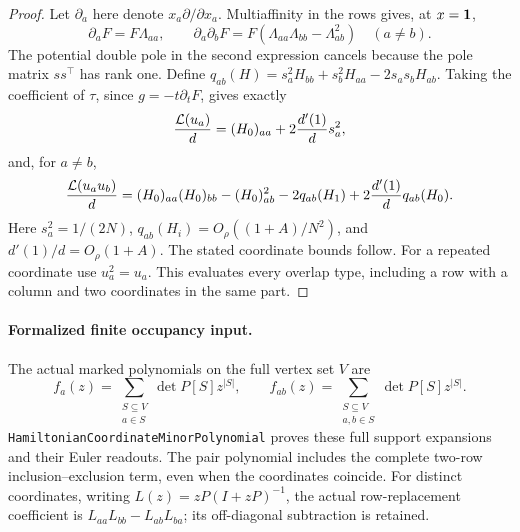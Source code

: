 \begin{proof}
Let \(\partial_a\) here denote \(x_a\partial/\partial x_a\).
Multiaffinity in the rows gives, at \(x=\mathbf1\),
\[
 \partial_aF=F\Lambda_{aa},\qquad
 \partial_a\partial_bF
      =F(\Lambda_{aa}\Lambda_{bb}-\Lambda_{ab}^2)
                       \quad(a\ne b).
\]
The potential double pole in the second expression cancels
because the pole matrix \(ss^\top\) has rank one.
Define
\(q_{ab}(H)=s_a^2H_{bb}+s_b^2H_{aa}-2s_as_bH_{ab}\).
Taking the coefficient of \(\tau\), since \(g=-t\partial_tF\),
gives exactly
\[
 \frac{{\cal L}(u_a)}d=(H_0)_{aa}
                                  +2\frac{d'(1)}d s_a^2 ,
\]
and, for \(a\ne b\),
\[
 \frac{{\cal L}(u_a u_b)}d
 = (H_0)_{aa}(H_0)_{bb}-(H_0)_{ab}^2
       -2q_{ab}(H_1)+2\frac{d'(1)}d q_{ab}(H_0).
\]
Here \(s_a^2=1/(2N)\),
\(q_{ab}(H_i)=O_\rho((1+A)/N^2)\), and
\(d'(1)/d=O_\rho(1+A)\).
The stated coordinate bounds follow.
For a repeated coordinate use \(u_a^2=u_a\).
This evaluates every overlap type, including a row with
a column and two coordinates in the same part.
\end{proof}

\paragraph{Formalized finite occupancy input.}
The actual marked polynomials on the full vertex set \(V\) are
\[
 f_a(z)=\sum_{\substack{S\subseteq V\\a\in S}}\det P[S]z^{|S|},
 \qquad
 f_{ab}(z)=\sum_{\substack{S\subseteq V\\a,b\in S}}\det P[S]z^{|S|}.
\]
\texttt{HamiltonianCoordinateMinorPolynomial} proves these full
support expansions and their Euler readouts. The pair polynomial
includes the complete two-row inclusion--exclusion term, even when
the coordinates coincide. For distinct coordinates, writing \(L(z)=zP(I+zP)^{-1}\),
the actual row-replacement coefficient is
\(L_{aa}L_{bb}-L_{ab}L_{ba}\);
its off-diagonal subtraction is retained.

